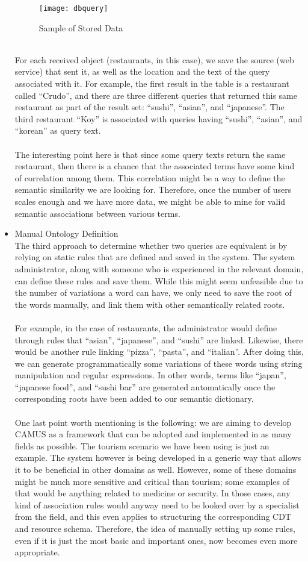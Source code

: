 \begin{itemize}
\begin{figure}[h]
\centering
\texttt{[image: dbquery]}
\caption{Sample of Stored Data}
\end{figure}
\\
For each received object (restaurants, in this case), we save the source (web service) that sent it, as well as the location and the text of the query associated with it. For example, the first result in the table is a restaurant called ``Crudo'', and there are three different queries that returned this same restaurant as part of the result set: ``sushi'', ``asian'', and ``japanese''. The third restaurant ``Koy'' is associated with queries having ``sushi'', ``asian'', and ``korean'' as query text.\\\\
The interesting point here is that since some query texts return the same restaurant, then there is a chance that the associated terms have some kind of correlation among them. This correlation might be a way to define the semantic similarity we are looking for. Therefore, once the number of users scales enough and we have more data, we might be able to mine for valid semantic associations between various terms.
\pagebreak
\item Manual Ontology Definition\\
The third approach to determine whether two queries are equivalent is by relying on static rules that are defined and saved in the system. The system administrator, along with someone who is experienced in the relevant domain, can define these rules and save them. While this might seem unfeasible due to the number of variations a word can have, we only need to save the root of the words manually, and link them with other semantically related roots.\\\\
For example, in the case of restaurants, the administrator would define through rules that ``asian'', ``japanese'', and ``sushi'' are linked. Likewise, there would be another rule linking ``pizza'', ``pasta'', and ``italian''. After doing this, we can generate programmatically some variations of these words using string manipulation and regular expressions. In other words, terms like ``japan'', ``japanese food'', and ``sushi bar'' are generated automatically once the corresponding roots have been added to our semantic dictionary.\\\\
One last point worth mentioning is the following: we are aiming to develop CAMUS as a framework that can be adopted and implemented in as many fields as possible. The tourism scenario we have been using is just an example. The system however is being developed in a generic way that allows it to be beneficial in other domains as well. However, some of these domains might be much more sensitive and critical than tourism; some examples of that would be anything related to medicine or security. In those cases, any kind of association rules would anyway need to be looked over by a specialist from the field, and this even applies to structuring the corresponding CDT and resource schema. Therefore, the idea of manually setting up some rules, even if it is just the most basic and important ones, now becomes even more appropriate.

\end{itemize}
